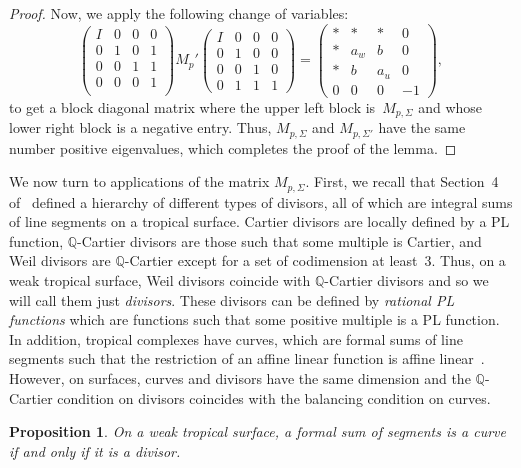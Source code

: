 \documentclass[11pt]{amsart}
\newtheorem{prop}[thm]{Proposition}
\theoremstyle{definition}
\newcommand{\defi}[1]{\emph{#1}}
\newcommand{\QQ}{\mathbb Q}
\begin{document}
\begin{proof}
Now, we apply the following change of variables:
\begin{equation*}
\begin{pmatrix}
I & 0 & 0 & 0 \\
0 & 1 & 0 & 1 \\
0 & 0 & 1 & 1 \\
0 & 0 & 0 & 1 \\
\end{pmatrix} M_p' \begin{pmatrix}
I & 0 & 0 & 0 \\
0 & 1 & 0 & 0 \\
0 & 0 & 1 & 0 \\
0 & 1 & 1 & 1
\end{pmatrix} = \begin{pmatrix}
* & * & * & 0 \\
* & a_w & b & 0 \\
* & b & a_u & 0 \\
0 & 0 & 0 & -1
\end{pmatrix},
\end{equation*}
to get a block diagonal matrix where the upper left block is~$M_{p,\Sigma}$
and whose lower right block is a negative entry.
Thus, $M_{p,\Sigma}$ and $M_{p,\Sigma'}$ have the same number positive
eigenvalues, which completes the proof of the lemma.
\end{proof}

We now turn to applications of the matrix $M_{p,\Sigma}$.
First, we recall that Section~4 of~\cite{cartwright-complexes} defined a hierarchy of different types
of divisors, all of which are integral sums of line segments on a tropical
surface. Cartier divisors are locally defined by a PL function, $\QQ$-Cartier
divisors are those such that some multiple is Cartier, and Weil divisors are
$\QQ$-Cartier except for a set of codimension at least~$3$. Thus, on a weak
tropical surface, Weil divisors coincide with $\QQ$-Cartier divisors and so we
will call them just \defi{divisors}. These divisors can be defined by
\defi{rational PL functions} which are functions such that some positive
multiple is a PL function. In addition, tropical complexes have
curves, which are formal sums of line segments such that the restriction of an
affine linear function is affine linear~\cite[Def.~5.2]{cartwright-complexes}.
However, on surfaces, curves and divisors have the same dimension and the
$\QQ$-Cartier condition on divisors coincides with the balancing condition on
curves.

\begin{prop}\label{prop:curve-divisor}
On a weak tropical surface, a formal sum of segments is a curve if and only if
it is a divisor.
\end{prop}
\end{document}
